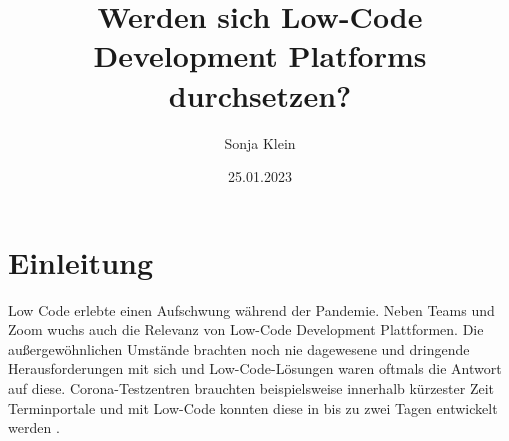 \documentclass[12pt]{article} %
\title{Werden sich Low-Code Development Platforms durchsetzen?}
\author{Sonja Klein}
\date{25.01.2023}
\begin{document}
	
	
	
	
	
	
	\maketitle	
	\tableofcontents
	\newpage
	
	\section{Einleitung}
	Low Code erlebte einen Aufschwung während der Pandemie. Neben Teams und Zoom wuchs auch die Relevanz von Low-Code Development Plattformen. Die außergewöhnlichen Umstände brachten noch nie dagewesene und dringende Herausforderungen mit sich und Low-Code-Lösungen waren oftmals die Antwort auf diese. Corona-Testzentren brauchten beispielsweise innerhalb kürzester Zeit Terminportale und mit Low-Code konnten diese in bis zu zwei Tagen entwickelt werden \cite{AmyGlasscock.2021}. \newline 
	
\end{document}
